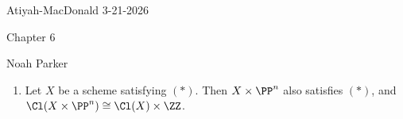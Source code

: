 \documentclass[12pt]{amsart}
\begin{document}
{Atiyah-MacDonald} \hfill {3-21-2026}

\bigskip\bigskip

\begin{center}

{\sc Chapter 6}

\end{center}

\begin{center}

  {Noah Parker} %
    
\end{center}

\bigskip

\begin{enumerate}
  \item[6.1.] {
      Let $X$ be a scheme satisfying $(*)$.
      Then $X\times \PP^n$ also satisfies $(*)$, and $\Cl(X\times \PP^n)\cong \Cl(X)\times \ZZ$.
    }
\end{enumerate}
\end{document}
